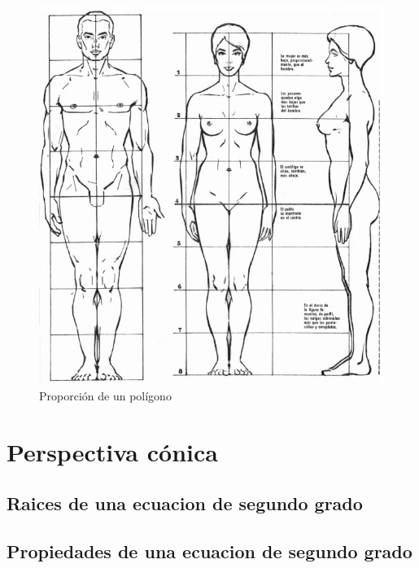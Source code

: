 \documentclass[
  11pt,
]{krantz}
\theoremstyle{definition}
\theoremstyle{definition}
\theoremstyle{definition}
\theoremstyle{definition}
\theoremstyle{remark}
\begin{document}
\begin{figure}

{\centering \includegraphics[width=1\linewidth,height=1\textheight]{canon} 

}

\caption{Proporción de un polígono}\label{fig:canonfig}
\end{figure}

\hypertarget{perspectiva-cuxf3nica}{%
\chapter{Perspectiva cónica}\label{perspectiva-cuxf3nica}}

\citep{xie2015}

\hypertarget{raices-de-una-ecuacion-de-segundo-grado}{%
\section{Raices de una ecuacion de segundo grado}\label{raices-de-una-ecuacion-de-segundo-grado}}

\hypertarget{propiedades-de-una-ecuacion-de-segundo-grado}{%
\section{Propiedades de una ecuacion de segundo grado}\label{propiedades-de-una-ecuacion-de-segundo-grado}}
\end{document}
